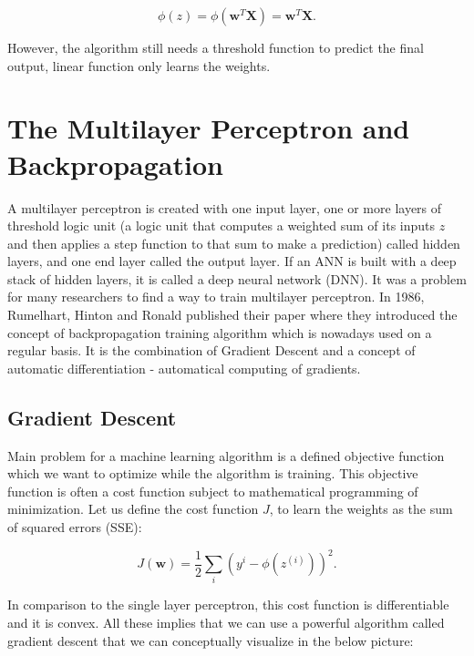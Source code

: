 \documentclass[a4paper,oneside,openright,11pt]{book}
\begin{document}
\begin{equation}
    \phi(z) =  \phi(\textbf{w}^{T} \textbf{X}) = \textbf{w}^{T} \textbf{X}.
\end{equation}

However, the algorithm still needs  a threshold function to predict the final output, linear function only learns the weights.

\section{The Multilayer Perceptron and Backpropagation}

A multilayer perceptron is created with one input layer, one or more layers of threshold logic unit (a logic unit that computes a weighted sum of its inputs $z$ and then applies a step function to that sum to make a prediction) called hidden layers, and one end layer called the output layer. If an ANN is built with a deep stack of hidden layers, it is called a deep neural network (DNN). It was a problem for many researchers to find a way to train multilayer perceptron. In 1986, Rumelhart, Hinton and Ronald published their paper \cite{rumelhart1985learning} where they introduced the concept of backpropagation training algorithm which is nowadays used on a regular basis. It is the combination of Gradient Descent and a concept of automatic differentiation - automatical computing of gradients.


\subsection{Gradient Descent}

Main problem for a machine learning algorithm is a defined objective function which we want to optimize while the algorithm is training. This objective function is often a cost function subject to mathematical programming of minimization. Let us define the cost function $J$, to learn the weights as the sum of squared errors (SSE):

\begin{equation}
    J(\textbf{w}) = \frac{1}{2}\sum_{i}^{}(y^{i} - \phi(z^{(i)}))^{2}.
\end{equation}

In comparison to the single layer perceptron, this cost function is differentiable and it is convex. All these implies that we can use a powerful algorithm called gradient descent that we can conceptually visualize in the below picture:
\end{document}
